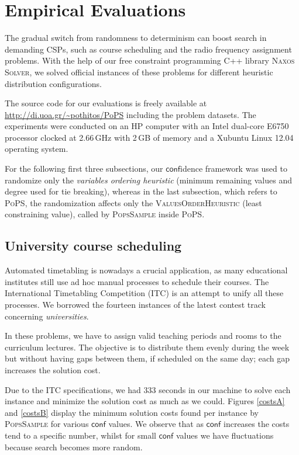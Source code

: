 \documentclass{ws-ijait}
\begin{document}
\section{Empirical Evaluations}

The gradual switch from randomness to determinism can boost
search in demanding CSPs, such as course scheduling and the
radio frequency assignment problems. With the help of our
free constraint programming C++ library \textsc{Naxos
Solver},\cite{Naxos} we solved official instances of these
problems for different heuristic distribution
configurations.

The source code for our evaluations is freely available at
\url{http://di.uoa.gr/~pothitos/PoPS} including the problem
datasets. The experiments were conducted on an HP computer
with an Intel dual-core E6750 processor clocked at 2.66\,GHz
with 2\,GB of memory and a Xubuntu Linux 12.04 operating
system.

For the following first three subsections, our
$\mathsf{conf}$idence framework was used to randomize only
the \emph{variables ordering heuristic} (minimum remaining
values and degree used for tie breaking), whereas in the
last subsection, which refers to \textsc{PoPS}, the
randomization affects only the \textsc{ValuesOrderHeuristic}
(least constraining value), called by \textsc{PopsSample}
inside \textsc{PoPS}.

\subsection{University course scheduling\label{ITC}}

Automated timetabling is nowadays a crucial application, as
many educational institutes still use ad hoc manual
processes to schedule their courses. The International
Timetabling Competition (ITC) is an attempt to unify all
these processes. We borrowed the fourteen instances of the
latest contest track concerning
\emph{universities}.\cite{itc-agenda}

In these problems, we have to assign valid teaching periods
and rooms to the curriculum lectures. The objective is to
distribute them evenly during the week but without having
gaps between them, if scheduled on the same day; each gap
increases the solution cost.\cite{pothitos-ictai2012}

Due to the ITC specifications, we had 333 seconds in our
machine to solve each instance and minimize the solution
cost as much as we could. Figures \ref{costsA} and
\ref{costsB} display the minimum solution costs found per
instance by \textsc{PopsSample} for various $\mathsf{conf}$
values. We observe that as $\mathsf{conf}$ increases the
costs tend to a specific number, whilst for small
$\mathsf{conf}$ values we have fluctuations because search
becomes more random.
\end{document}
